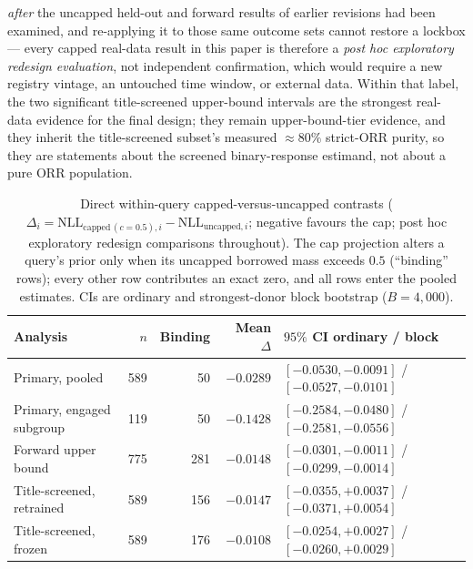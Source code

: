 \documentclass[11pt]{article}
\begin{document}
\emph{after} the uncapped held-out and forward results of earlier
revisions had been examined, and re-applying it to those same outcome sets
cannot restore a lockbox --- every capped real-data result in this paper
is therefore a \emph{post hoc exploratory redesign evaluation}, not
independent confirmation, which would require a new registry vintage, an
untouched time window, or external data. Within that label, the two
significant title-screened upper-bound intervals are the strongest
real-data evidence for the final design; they remain upper-bound-tier
evidence, and they inherit the title-screened subset's measured
$\approx 80\%$ strict-ORR purity, so they are statements about the
screened binary-response estimand, not about a pure ORR population.

\begin{table}[htbp]
\centering
\small
\caption{Direct within-query capped-versus-uncapped contrasts
($\Delta_i = \mathrm{NLL}_{\mathrm{capped}\,(c=0.5),i} -
\mathrm{NLL}_{\mathrm{uncapped},i}$; negative favours the cap; post hoc
exploratory redesign comparisons throughout). The cap projection alters
a query's prior only when its uncapped borrowed mass exceeds $0.5$
(``binding'' rows); every other row contributes an exact zero, and all
rows enter the pooled estimates. CIs are ordinary and strongest-donor
block bootstrap ($B = 4{,}000$).}
\label{tab:directpaired}
\setlength{\tabcolsep}{4.5pt}
\begin{tabular}{lrrrl}
\toprule
Analysis & $n$ & Binding & Mean $\Delta$ & $95\%$ CI ordinary / block \\
\midrule
Primary, pooled & 589 & 50 & $-0.0289$ & $[-0.0530,-0.0091]$ / $[-0.0527,-0.0101]$ \\
Primary, engaged subgroup & 119 & 50 & $-0.1428$ & $[-0.2584,-0.0480]$ / $[-0.2581,-0.0556]$ \\
Forward upper bound & 775 & 281 & $-0.0148$ & $[-0.0301,-0.0011]$ / $[-0.0299,-0.0014]$ \\
Title-screened, retrained & 589 & 156 & $-0.0147$ & $[-0.0355,+0.0037]$ / $[-0.0371,+0.0054]$ \\
Title-screened, frozen & 589 & 176 & $-0.0108$ & $[-0.0254,+0.0027]$ / $[-0.0260,+0.0029]$ \\
\bottomrule
\end{tabular}
\end{table}
\end{document}
